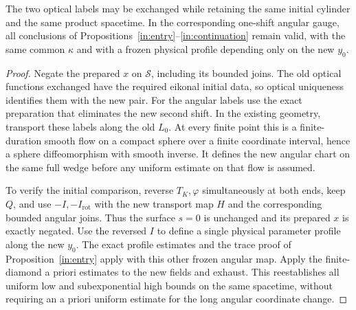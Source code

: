\begin{lemma}\label{in:label-swap}
The two optical labels may be exchanged while retaining the same
initial cylinder and the same product spacetime. In the corresponding
one-shift angular gauge, all conclusions of
Propositions~\ref{in:entry}--\ref{in:continuation} remain valid,
with the same common $\kappa$ and with a frozen physical profile
depending only on the new $y_0$.
\end{lemma}

\begin{proof}
Negate the prepared $x$ on $\mathcal S$, including its bounded joins.
The old optical functions exchanged have the required eikonal initial
data, so optical uniqueness identifies them with the new pair.
For the angular labels use the exact preparation that eliminates the
new second shift. In the existing geometry, transport these labels
along the old $L_0$. At every finite point this is a finite-duration
smooth flow on a compact sphere over a finite coordinate interval,
hence a sphere diffeomorphism with smooth inverse. It defines the new
angular chart on the same full wedge before any uniform estimate on
that flow is assumed.

To verify the initial comparison, reverse $T_K,\varphi$
simultaneously at both ends, keep $Q$, and use $-I,-I_{\mathrm{rot}}$
with the new transport map $H$ and the corresponding bounded angular
joins. Thus the surface $s=0$ is unchanged and its prepared $x$ is
exactly negated. Use the reversed $I$ to define a single physical
parameter profile along the new $y_0$. The exact profile estimates
and the trace proof of Proposition~\ref{in:entry} apply with this
other frozen angular map. Apply the finite-diamond a priori estimates
to the new fields and exhaust. This reestablishes all uniform low and
subexponential high bounds on the same spacetime, without requiring
an a priori uniform estimate for the long angular coordinate change.
\end{proof}
